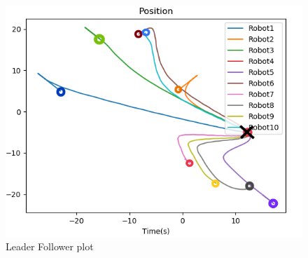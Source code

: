 \documentclass[10pt]{beamer}
\begin{document}
\begin{frame}
\begin{minipage}{0.47\textwidth}
\begin{figure}[h!]
			\centering
			\includegraphics[scale=0.27]{Position-leader.png}
			\caption{Leader Follower plot}
			\label{Fig:pos_y_c}
		\end{figure}
	\end{minipage}


\end{frame}
\end{document}

